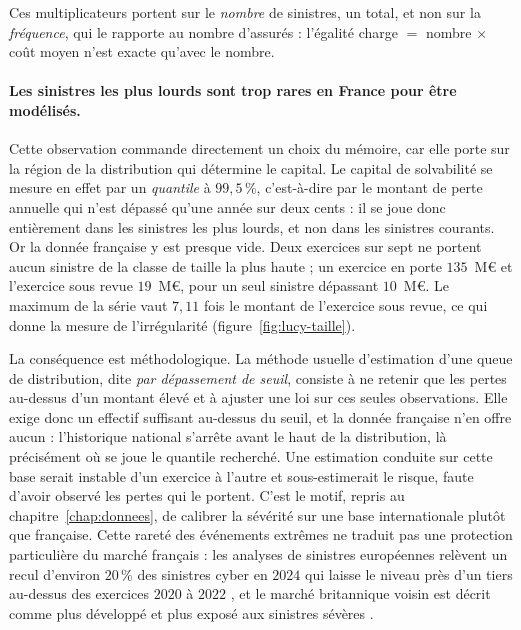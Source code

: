 \noindent Ces multiplicateurs portent sur le \emph{nombre} de sinistres, un total, et non sur la
\emph{fréquence}, qui le rapporte au nombre d'assurés : l'égalité charge $=$ nombre $\times$ coût
moyen n'est exacte qu'avec le nombre.

\paragraph{Les sinistres les plus lourds sont trop rares en France pour être modélisés.} Cette
observation commande directement un choix du mémoire, car elle porte sur la région de la
distribution qui détermine le capital. Le capital de solvabilité se mesure en effet par un
\emph{quantile} à $99{,}5\,\%$, c'est-à-dire par le montant de perte annuelle qui n'est dépassé
qu'une année sur deux cents : il se joue donc entièrement dans les sinistres les plus lourds, et
non dans les sinistres courants. Or la donnée française y est presque vide. Deux exercices sur
sept ne portent aucun sinistre de la classe de taille la plus haute ; un exercice en porte
$135$~M\euro{} et l'exercice sous revue $19$~M\euro, pour un seul sinistre dépassant $10$~M\euro. Le
maximum de la série vaut $7{,}11$ fois le montant de l'exercice sous revue, ce qui donne la
mesure de l'irrégularité (figure~\ref{fig:lucy-taille}).

\medskip
\noindent La conséquence est méthodologique. La méthode usuelle d'estimation d'une queue de
distribution, dite \emph{par dépassement de seuil}, consiste à ne retenir que les pertes
au-dessus d'un montant élevé et à ajuster une loi sur ces seules observations. Elle exige donc un
effectif suffisant au-dessus du seuil, et la donnée française n'en offre aucun : l'historique
national s'arrête avant le haut de la distribution, là précisément où se joue le quantile
recherché. Une estimation conduite sur cette base serait instable d'un exercice à l'autre et
sous-estimerait le risque, faute d'avoir observé les pertes qui le portent. C'est le motif,
repris au chapitre~\ref{chap:donnees}, de calibrer la sévérité sur une base internationale plutôt
que française. Cette rareté des événements extrêmes ne traduit pas une protection particulière du
marché français : les analyses de sinistres européennes relèvent un recul d'environ $20\,\%$ des
sinistres cyber en $2024$ qui laisse le niveau près d'un tiers au-dessus des exercices $2020$ à
$2022$ \citep{marsh2025}, et le marché britannique voisin est décrit comme plus développé et plus
exposé aux sinistres sévères \citep{dsit2025}.

